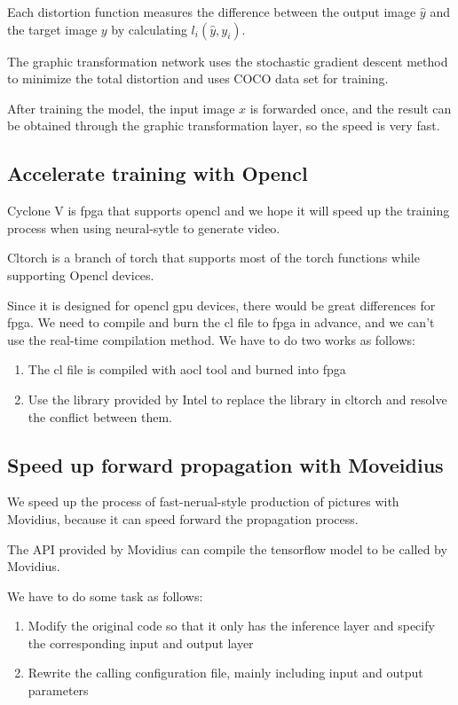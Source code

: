 Each distortion function measures the difference between the output image $\hat y$ and the target image $y$ by calculating $l_i(\hat y,y_i)$.

The graphic transformation network uses the stochastic gradient descent method to minimize the total distortion and uses COCO data set for training.

After training the model, the input image $x$ is forwarded once, and the result can be obtained through the graphic transformation layer, so the speed is very fast.

\subsection{Accelerate training with Opencl}
Cyclone V is fpga that supports opencl and we hope it will speed up the training process when using neural-sytle to generate video.

Cltorch is a branch of torch that supports most of the torch functions while supporting Opencl devices.

Since it is designed for opencl gpu devices, there would be great differences for fpga.
We need to compile and burn the cl file to fpga in advance, and we can't use the real-time compilation method.
We have to do two works as follows:
\begin{enumerate}
  \item The cl file is compiled with aocl tool and burned into fpga
  \item Use the library provided by Intel to replace the library in cltorch and resolve the conflict between them.
\end{enumerate}

\subsection{Speed up forward propagation with Moveidius}
We speed up the process of fast-nerual-style production of pictures with Movidius, because it can speed forward the propagation process.

The API provided by Movidius can compile the tensorflow model to be called by Movidius.

We have to do some task as follows:
\begin{enumerate}
  \item Modify the original code so that it only has the inference layer and specify the corresponding input and output layer
  \item Rewrite the calling configuration file, mainly including input and output parameters
\end{enumerate}

